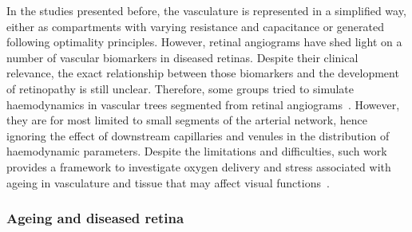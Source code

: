 \documentclass[12pt,a4paper]{article}
\begin{document}
In the studies presented before, the vasculature is represented in a simplified way, either as compartments with varying resistance and capacitance or generated following optimality principles.
However, retinal angiograms have shed light on a number of vascular biomarkers in diseased retinas.
Despite their clinical relevance, the exact relationship between those biomarkers and the development of retinopathy is still unclear.
Therefore, some groups tried to simulate haemodynamics in vascular trees segmented from retinal angiograms~\cite{Aletti_2016, Malek_2015, Liu_2009, Rebhan_2019}.
However, they are for most limited to small segments of the arterial network, hence ignoring the effect of downstream capillaries and venules in the distribution of haemodynamic parameters.
Despite the limitations and difficulties, such work provides a framework to investigate oxygen delivery and stress associated with ageing in vasculature and tissue that may affect visual functions~\cite{Rickett_2010,Sim_2013,Wessel_2012}.

\break

\subsubsection{Ageing and diseased retina}
\end{document}
